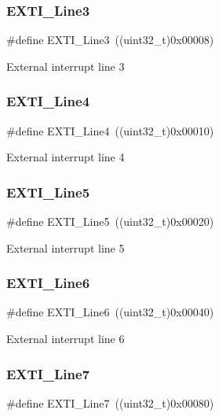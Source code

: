 \subsubsection{\texorpdfstring{EXTI\_Line3}{EXTI\_Line3}}
{\footnotesize\ttfamily \#define E\+X\+T\+I\+\_\+\+Line3~((uint32\+\_\+t)0x00008)}

External interrupt line 3 \mbox{\label{group___e_x_t_i___lines_gab33b1fe19306e9e60f8f8d0928b800be}} 
\subsubsection{\texorpdfstring{EXTI\_Line4}{EXTI\_Line4}}
{\footnotesize\ttfamily \#define E\+X\+T\+I\+\_\+\+Line4~((uint32\+\_\+t)0x00010)}

External interrupt line 4 \mbox{\label{group___e_x_t_i___lines_ga6b4c6292e3abd521cab2bf99d37a15c6}} 
\subsubsection{\texorpdfstring{EXTI\_Line5}{EXTI\_Line5}}
{\footnotesize\ttfamily \#define E\+X\+T\+I\+\_\+\+Line5~((uint32\+\_\+t)0x00020)}

External interrupt line 5 \mbox{\label{group___e_x_t_i___lines_ga97a5145d1d2612dd53bdd9db3d366873}} 
\subsubsection{\texorpdfstring{EXTI\_Line6}{EXTI\_Line6}}
{\footnotesize\ttfamily \#define E\+X\+T\+I\+\_\+\+Line6~((uint32\+\_\+t)0x00040)}

External interrupt line 6 \mbox{\label{group___e_x_t_i___lines_ga3b7155d54a4a98394b599718901ccbe5}} 
\subsubsection{\texorpdfstring{EXTI\_Line7}{EXTI\_Line7}}
{\footnotesize\ttfamily \#define E\+X\+T\+I\+\_\+\+Line7~((uint32\+\_\+t)0x00080)}

